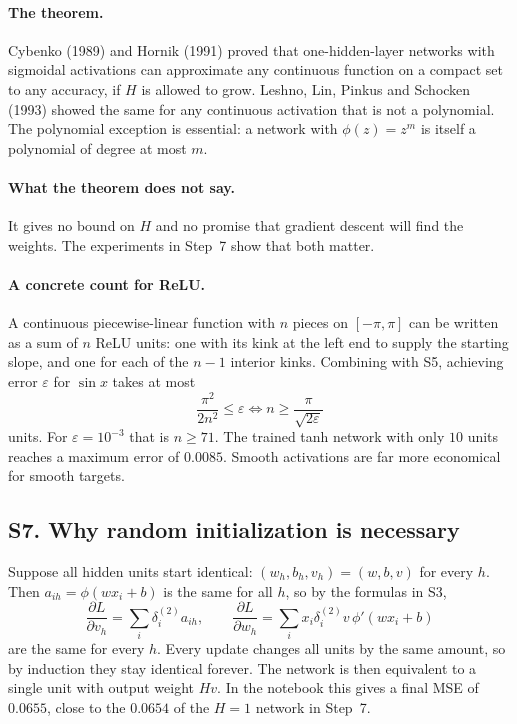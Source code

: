 \documentclass[11pt]{article}
\begin{document}
\paragraph{The theorem.} Cybenko (1989) and Hornik (1991) proved that one-hidden-layer networks with sigmoidal activations can approximate any continuous function on a compact set to any accuracy, if $H$ is allowed to grow. Leshno, Lin, Pinkus and Schocken (1993) showed the same for any continuous activation that is not a polynomial. The polynomial exception is essential: a network with $\phi(z)=z^m$ is itself a polynomial of degree at most $m$.

\paragraph{What the theorem does not say.} It gives no bound on $H$ and no promise that gradient descent will find the weights. The experiments in Step~7 show that both matter.

\paragraph{A concrete count for ReLU.} A continuous piecewise-linear function with $n$ pieces on $[-\pi,\pi]$ can be written as a sum of $n$ ReLU units: one with its kink at the left end to supply the starting slope, and one for each of the $n-1$ interior kinks. Combining with S5, achieving error $\varepsilon$ for $\sin x$ takes at most
\[
  \frac{\pi^2}{2n^2}\le\varepsilon\iff n\ge\frac{\pi}{\sqrt{2\varepsilon}}
\]
units. For $\varepsilon=10^{-3}$ that is $n\ge71$. The trained tanh network with only $10$ units reaches a maximum error of $0.0085$. Smooth activations are far more economical for smooth targets.

\subsection*{S7. Why random initialization is necessary}
Suppose all hidden units start identical: $(w_h,b_h,v_h)=(w,b,v)$ for every $h$. Then $a_{ih}=\phi(wx_i+b)$ is the same for all $h$, so by the formulas in S3,
\[
  \frac{\partial L}{\partial v_h}=\sum_i\delta^{(2)}_ia_{ih},\qquad
  \frac{\partial L}{\partial w_h}=\sum_ix_i\delta^{(2)}_iv\,\phi'(wx_i+b)
\]
are the same for every $h$. Every update changes all units by the same amount, so by induction they stay identical forever. The network is then equivalent to a single unit with output weight $Hv$. In the notebook this gives a final MSE of $0.0655$, close to the $0.0654$ of the $H=1$ network in Step~7.
\end{document}
